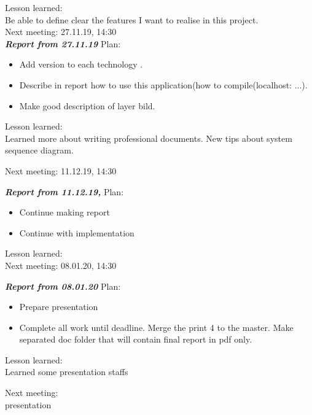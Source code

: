 \documentclass{scrartcl}
\begin{document}
Lesson learned:\\
Be able to define clear the features I want to realise in this project.\\
Next meeting: {27.11.19, 14:30} \\




\textbf{\textit{Report from 27.11.19}}
Plan:\\
\begin{itemize}
	\item	Add version to each technology .

	\item	Describe in report how to use this application(how to compile(localhost: ...).
	\item Make good description of layer bild.

\end{itemize}

Lesson learned:\\ Learned more about writing professional documents. New tips about system sequence diagram.

Next meeting: {11.12.19, 14:30}


\textbf{\textit{Report from 11.12.19, }}
Plan:\\
\begin{itemize}
	\item	 Continue making report 
	
	\item	Continue with implementation

\end{itemize}

Lesson learned:\\

Next meeting: {08.01.20, 14:30}


\textbf{\textit{Report from 08.01.20 }}
Plan:\\
\begin{itemize}
	\item	 Prepare presentation 

	\item	 Complete all work until deadline. Merge the print 4 to the master. Make separated doc folder that will contain final report in pdf only. 

\end{itemize}

Lesson learned:\\ Learned some presentation staffs

Next meeting: \\ {presentation}
\end{document}
